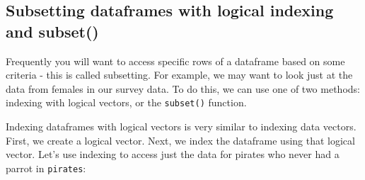 \documentclass{tufte-book}\usepackage[]{graphicx}\usepackage[]{color}
\makeatletter
\newcommand{\hlopt}[1]{\textcolor[rgb]{0,0,0}{#1}}%
\newcommand{\hlstd}[1]{\textcolor[rgb]{0.345,0.345,0.345}{#1}}%
\newcommand{\hlkwd}[1]{\textcolor[rgb]{0.737,0.353,0.396}{\textbf{#1}}}%
\newenvironment{kframe}{%
 \def\at@end@of@kframe{}%
 \ifinner\ifhmode%
  \def\at@end@of@kframe{\end{minipage}}%
  \begin{minipage}{\columnwidth}%
 \fi\fi%
 \def\FrameCommand##1{\hskip\@totalleftmargin \hskip-\fboxsep
 \colorbox{shadecolor}{##1}\hskip-\fboxsep
     \hskip-\linewidth \hskip-\@totalleftmargin \hskip\columnwidth}%
 \MakeFramed {\advance\hsize-\width
   \@totalleftmargin\z@ \linewidth\hsize
   \@setminipage}}%
 {\par\unskip\endMakeFramed%
 \at@end@of@kframe}
\newenvironment{knitrout}{}{} %
\makeatother
\begin{document}
\begin{footnotesize}


\section{Subsetting dataframes with logical indexing and subset()}

Frequently you will want to access specific rows of a dataframe based on some criteria - this is called subsetting. For example, we may want to look just at the data from females in our survey data. To do this, we can use one of two methods: indexing with logical vectors, or the \texttt{subset()} function.

Indexing dataframes with logical vectors is very similar to indexing data vectors. First, we create a logical vector. Next, we index the dataframe using that logical vector. Let's use indexing to access just the data for pirates who never had a parrot in \texttt{pirates}:


\end{footnotesize}
\end{document}
